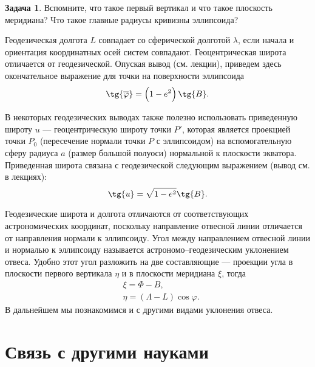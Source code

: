 \documentclass[11pt, a4paper]{article}
\theoremstyle{plain}
\theoremstyle{definition}
\newtheorem{problem}{Задача}[section]
\theoremstyle{remark}
\renewcommand{\phi}{\ensuremath{\varphi}}
\begin{document}
\begin{problem}
    Вспомните, что такое первый вертикал и что такое плоскость меридиана? Что такое главные радиусы
    кривизны эллипсоида?
\end{problem}

Геодезическая долгота $L$ совпадает со сферической
долготой $\lambda$, если начала и ориентация координатных осей систем совпадают. 
Геоцентрическая широта отличается от геодезической. Опуская вывод (см. лекции), приведем здесь окончательное выражение для точки на поверхности
эллипсоида
\begin{equation*}
    \tg{\overline{\phi}} = \left( 1 - e^2 \right)\tg{B}.
\end{equation*}

В некоторых геодезических выводах также полезно использовать приведенную широту $u$ --- геоцентрическую широту точки $P'$, которая является проекцией точки $P_0$ (пересечение нормали точки $P$ с эллипсоидом) на вспомогательную сферу радиуса $a$ (размер большой полуоси) нормальной к плоскости экватора. Приведенная широта связана с геодезической следующим выражением (вывод см. в лекциях):
\begin{equation*}
    \tg{u} = \sqrt{1 - e^2}\tg{B}.
\end{equation*}

Геодезические широта и долгота отличаются от соответствующих астрономических координат, поскольку
направление отвесной линии отличается от направления нормали к эллипсоиду. Угол между направлением
отвесной линии и нормалью к эллипсоиду называется астрономо--геодезическим уклонением отвеса.
Удобно этот угол разложить на две составляющие --- проекции угла в плоскости первого вертикала
$\eta$  и в плоскости меридиана $\xi$, тогда
\begin{align*}
    &\xi = \Phi - B,\\
    &\eta = \left( \Lambda - L \right)\cos\phi.
\end{align*}
В дальнейшем мы познакомимся и с другими видами уклонения отвеса.

\section{Связь с другими науками}
\end{document}
